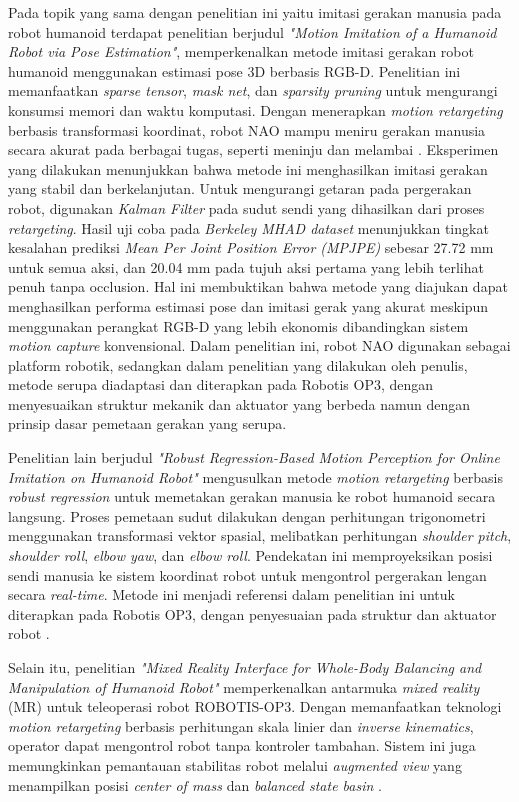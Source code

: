 Pada topik yang sama dengan penelitian ini yaitu imitasi gerakan manusia pada robot humanoid terdapat penelitian berjudul \textit{"Motion Imitation of a Humanoid Robot via Pose Estimation"}, memperkenalkan metode imitasi gerakan robot humanoid menggunakan estimasi pose 3D berbasis RGB-D. Penelitian ini memanfaatkan \textit{sparse tensor}, \textit{mask net}, dan \textit{sparsity pruning} untuk mengurangi konsumsi memori dan waktu komputasi. Dengan menerapkan \textit{motion retargeting} berbasis transformasi koordinat, robot NAO mampu meniru gerakan manusia secara akurat pada berbagai tugas, seperti meninju dan melambai . Eksperimen yang dilakukan menunjukkan bahwa metode ini menghasilkan imitasi gerakan yang stabil dan berkelanjutan. Untuk mengurangi getaran pada pergerakan robot, digunakan \textit{Kalman Filter} pada sudut sendi yang dihasilkan dari proses \textit{retargeting}. Hasil uji coba pada \textit{Berkeley MHAD dataset} menunjukkan tingkat kesalahan prediksi \textit{Mean Per Joint Position Error (MPJPE)} sebesar 27.72 mm untuk semua aksi, dan 20.04 mm pada tujuh aksi pertama yang lebih terlihat penuh tanpa occlusion. Hal ini membuktikan bahwa metode yang diajukan dapat menghasilkan performa estimasi pose dan imitasi gerak yang akurat meskipun menggunakan perangkat RGB-D yang lebih ekonomis dibandingkan sistem \textit{motion capture} konvensional. Dalam penelitian ini, robot NAO digunakan sebagai platform robotik, sedangkan dalam penelitian yang dilakukan oleh penulis, metode serupa diadaptasi dan diterapkan pada Robotis OP3, dengan menyesuaikan struktur mekanik dan aktuator yang berbeda namun dengan prinsip dasar pemetaan gerakan yang serupa.

Penelitian lain berjudul \textit{"Robust Regression-Based Motion Perception for Online Imitation on Humanoid Robot"} mengusulkan metode \textit{motion retargeting} berbasis \textit{robust regression} untuk memetakan gerakan manusia ke robot humanoid secara langsung. Proses pemetaan sudut dilakukan dengan perhitungan trigonometri menggunakan transformasi vektor spasial, melibatkan perhitungan \textit{shoulder pitch}, \textit{shoulder roll}, \textit{elbow yaw}, dan \textit{elbow roll}. Pendekatan ini memproyeksikan posisi sendi manusia ke sistem koordinat robot untuk mengontrol pergerakan lengan secara \textit{real-time}. Metode ini menjadi referensi dalam penelitian ini untuk diterapkan pada Robotis OP3, dengan penyesuaian pada struktur dan aktuator robot \cite{robust2017imitation}.

Selain itu, penelitian \textit{"Mixed Reality Interface for Whole-Body Balancing and Manipulation of Humanoid Robot"} memperkenalkan antarmuka \textit{mixed reality } (MR) untuk teleoperasi robot ROBOTIS-OP3. Dengan memanfaatkan teknologi \textit{motion retargeting} berbasis perhitungan skala linier dan \textit{inverse kinematics}, operator dapat mengontrol robot tanpa kontroler tambahan. Sistem ini juga memungkinkan pemantauan stabilitas robot melalui \textit{augmented view} yang menampilkan posisi \textit{center of mass} dan \textit{balanced state basin} .

